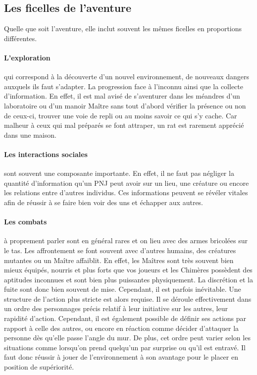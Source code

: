 \subsection{Les ficelles de l'aventure}

Quelle que soit l'aventure, elle inclut souvent les mêmes ficelles en proportions différentes.

\paragraph{L'exploration} qui correspond à la découverte d'un nouvel environnement, de nouveaux dangers auxquels ils faut s'adapter. La progression face à l'inconnu ainsi que la collecte d'information. En effet, il est mal avisé de s'aventurer dans les méandres d'un laboratoire ou d'un manoir Maître sans tout d'abord vérifier la présence ou non de ceux-ci, trouver une voie de repli ou au moins savoir ce qui s'y cache. Car malheur à ceux qui mal préparés se font attraper, un rat est rarement apprécié dans une maison.

\paragraph{Les interactions sociales} sont souvent une composante importante. En effet, il ne faut pas négliger la quantité d'information qu'un PNJ peut avoir sur un lieu, une créature ou encore les relations entre d'autres individus. Ces informations peuvent se révéler vitales afin de réussir à se faire bien voir des uns et échapper aux autres.

\paragraph{Les combats} à proprement parler sont en général rares et on lieu avec des armes bricolées sur le tas. Les affrontement se font souvent avec d'autres humains, des créatures mutantes ou un Maître affaiblit. En effet, les Maîtres sont très souvent bien mieux équipés, nourris et plus forts que vos joueurs et les Chimères possèdent des aptitudes inconnues et sont bien plus puissantes physiquement. La discrétion et la fuite sont donc bien souvent de mise.
Cependant, il est parfois inévitable. Une structure de l'action plus stricte est alors requise. Il se déroule effectivement dans un ordre des personnages précis relatif à leur initiative sur les autres, leur rapidité d'action. Cependant, il est également possible de définir ses actions par rapport à celle des autres, ou encore en réaction comme décider d'attaquer la personne dès qu'elle passe l'angle du mur. De plus, cet ordre peut varier selon les situations comme lorsqu'on prend quelqu'un par surprise ou qu'il est entravé. Il faut donc réussir à jouer de l'environnement à son avantage pour le placer en position de supériorité. 

